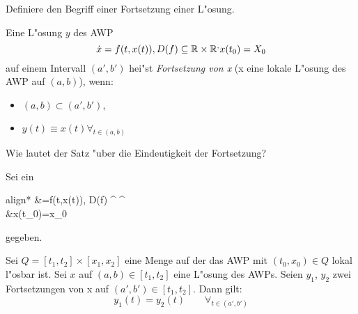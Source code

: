 \documentclass[9pt]{article}
\newcommand{\R}[1]{%
	\ifthenelse{\equal{#1}{}}
		{\mathbb{R}}
		{\mathbb{R}^{#1}}}%
\newenvironment{field}{}{\newpage}
\newif\ifnote
\newenvironment{note}{\notetrue}{\notefalse}
\newcommand{\localtag}{}
\newcommand{\globaltag}{}
\newcommand{\uuid}{}
\newcommand{\tags}[1]{
    \ifnote 
        \renewcommand{\localtag}{#1}
    \else
        \renewcommand{\globaltag}{#1}
    \fi 
    }
\newcommand{\xplain}[1]{\renewcommand{\uuid}{#1}}
\begin{document}
\begin{note}
	\xplain{UUID}
	\tags{definition, fortsetzung, 3.5.1}
	
	\begin{field}  %
		Definiere den Begriff einer Fortsetzung einer L"osung. 
	\end{field}
	
	\begin{field}  %
		Eine L"osung $y$ des AWP 
		\begin{equation*}
		\dot{x}=f(t,x(t)), D(f) \subseteq \R{} \times \R, x(t_0)=X_0
		\end{equation*}
		auf einem Intervall $(a',b')$ hei"st \textit{Fortsetzung von x} (x eine lokale L"osung des AWP auf $(a,b)$), wenn:
		\begin{itemize}
			\item $(a,b) \subset (a',b')$,
			\item $y(t) \equiv x(t) \forall_{t\in (a,b)}$
		\end{itemize}
	\end{field}
\end{note}
\begin{note}
	\xplain{UUID}
	\tags{satz, fortsetzung, 3.5.2}
	
	\begin{field}  %
		Wie lautet der Satz "uber die Eindeutigkeit der Fortsetzung?
	\end{field}
		
	\begin{field}  %
		Sei ein  
		\begin{empheq}[left= \text{AWP:~} \empheqlbrace]{align*}
		&=f(t,x(t)), D(f) \subseteq \R{} \times \R{} \\ 
		 &x(t_0)=x_0
		\end{empheq}
		gegeben.
		
		 Sei $Q=[t_1,t_2] \times [x_1,x_2]$ eine Menge auf der das AWP mit $(t_0, x_0) \in Q$
		lokal l"osbar ist. Sei $x$ auf $(a,b) \in [t_1,t_2]$ eine L"osung des AWPs. Seien $y_1$, $y_2$
		zwei Fortsetzungen von x auf $(a',b')\in [t_1,t_2]$. Dann gilt: 
		\begin{equation*}
		y_1(t) = y_2(t) \qquad \forall_{t\in (a',b')}
		\end{equation*}
	\end{field}
\end{note}
\end{document}
